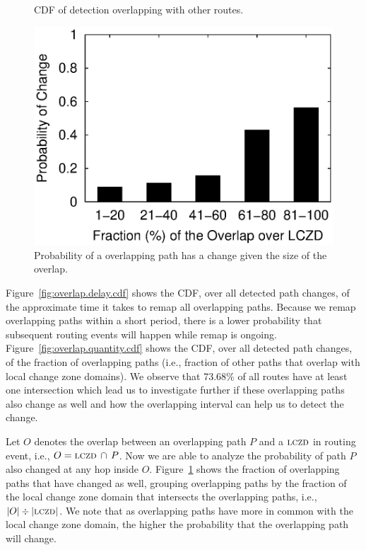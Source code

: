 \begin{figure}
\begin{minipage}{0.32\textwidth}
\caption{CDF of detection overlapping with other routes.}
\label{fig:overlap.quantity.cdf}
\end{minipage}
%
\hfill
\begin{minipage}{0.32\textwidth}
\includegraphics[width=0.8\columnwidth]{figs/patching/probchange/probchange.eps}
\caption{Probability of a overlapping path has a change given the size of the overlap.}
\label{fig:overlap.change.prob}
\end{minipage}
\end{figure}


Figure~\ref{fig:overlap.delay.cdf} shows the CDF, over all detected
path changes, of the approximate time it takes to remap all
overlapping paths.  Because we remap overlapping paths within
a short period, there is a lower probability that subsequent routing
events will happen while remap is ongoing. 
Figure~\ref{fig:overlap.quantity.cdf} shows the CDF, over all
detected path changes, of the fraction of overlapping paths (i.e.,
fraction of other paths that overlap with local change zone
domains).  We observe that 73.68\% of all routes have at least one 
intersection which lead us to investigate further if these
overlapping paths also change as well and how the overlapping
interval can help us to detect the change.


Let $O$ denotes the overlap between an overlapping path $P$ and a $\mathrm{\textsc{lczd}}$ in routing event, i.e.,
$O = \mathrm{\textsc{lczd}}\,\cap\,P$. Now we are able to analyze the probability of path $P$ 
also changed at any hop inside $O$. Figure~\ref{fig:overlap.change.prob} shows
the fraction of overlapping paths that have changed as well, grouping
overlapping paths by the fraction of the local change zone domain
that intersects the overlapping paths, i.e.,
$|O|\div|\mathrm{\textsc{lczd}}|$.  We note that as overlapping paths
have more in common with the local change zone domain, the higher
the probability that the overlapping path will change. 

